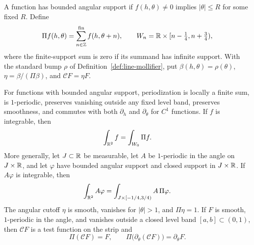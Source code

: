 \begin{definition}
\label{def:angular-periodization}
\leanok
A function has bounded angular support if $f(h,\theta)\ne0$ implies
$|\theta|\le R$ for some fixed $R$. Define
\[
  \Pi f(h,\theta)=\sum_{n\in\mathbb{Z}}^{\mathrm{fin}}f(h,\theta+n),\qquad
  W_n=\mathbb{R}\times[n-\tfrac14,n+\tfrac34),
\]
where the finite-support sum is zero if its summand has infinite support.
With the standard bump $\rho$ of Definition~\ref{def:line-mollifier}, put
$\beta(h,\theta)=\rho(\theta)$, $\eta=\beta/(\Pi\beta)$, and
$\mathcal CF=\eta F$.
\end{definition}

\begin{lemma}
\label{lem:angular-periodization}
\leanok
For functions with bounded angular support, periodization is locally a
finite sum, is $1$-periodic, preserves vanishing outside any fixed level
band, preserves smoothness, and commutes with both $\partial_h$ and
$\partial_\theta$ for $C^1$ functions. If $f$ is integrable, then
\[
  \int_{\mathbb{R}^2}f=\int_{W_0}\Pi f.
\]
More generally, let $J\subset\mathbb{R}$ be measurable, let $A$ be $1$-periodic
in the angle on $J\times\mathbb{R}$, and let $\varphi$ have bounded angular
support and closed support in $J\times\mathbb{R}$. If $A\varphi$ is integrable,
then
\[
  \int_{\mathbb{R}^2} A\varphi
    =\int_{J\times[-1/4,3/4)} A\,\Pi\varphi.
\]
The angular cutoff $\eta$ is smooth, vanishes for $|\theta|>1$, and
$\Pi\eta=1$. If $F$ is smooth, $1$-periodic in the angle, and vanishes
outside a closed level band $[a,b]\subset(0,1)$, then $\mathcal CF$ is a
test function on the strip and
\[
  \Pi(\mathcal CF)=F,\qquad
  \Pi\bigl(\partial_\theta(\mathcal CF)\bigr)=\partial_\theta F.
\]
\end{lemma}

